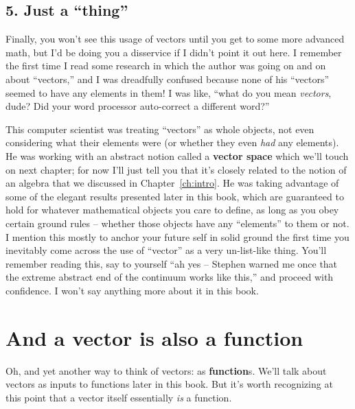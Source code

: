 \subsection{5. Just a ``thing''}

Finally, you won't see this usage of vectors until you get to some more
advanced math, but I'd be doing you a disservice if I didn't point it out here.
I remember the first time I read some research in which the author was going on
and on about ``vectors,'' and I was dreadfully confused because none of his
``vectors'' seemed to have any elements in them! I was like, ``what do you mean
\textit{vectors}, dude? Did your word processor auto-correct a different
word?''


This computer scientist was treating ``vectors'' as whole objects, not even
considering what their elements were (or whether they even \textit{had} any
elements). He was working with an abstract notion called a \label{vectorSpace}
\textbf{vector space} which we'll touch on next chapter; for now I'll just tell
you that it's closely related to the notion of an algebra that we discussed in
Chapter~\ref{ch:intro}. He was taking advantage of some of the elegant results
presented later in this book, which are guaranteed to hold for whatever
mathematical objects you care to define, as long as you obey certain ground
rules -- whether those objects have any ``elements'' to them or not. I mention
this mostly to anchor your future self in solid ground the first time you
inevitably come across the use of ``vector'' as a very un-list-like thing.
You'll remember reading this, say to yourself ``ah yes -- Stephen warned me
once that the extreme abstract end of the continuum works like this,'' and
proceed with confidence. I won't say anything more about it in this book.

\section{And a vector is also a function}

\label{vectorIsFunction}

Oh, and yet another way to think of vectors: as \textbf{function}s. We'll talk
about vectors as inputs to functions later in this book. But it's worth
recognizing at this point that a vector itself essentially \textit{is} a
function.


